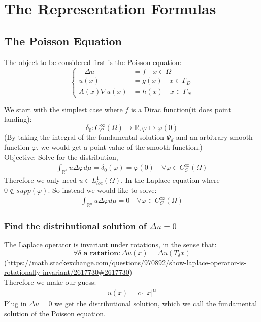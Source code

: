 \documentclass[a4paper,11pt,oneside,fleqn]{book}
\theoremstyle{definition}
\theoremstyle{remark}
\begin{document}
\newpage
\section{The Representation Formulas}
\subsection{The Poisson Equation}
The object to be considered first is the Poisson equation:
\begin{equation}\label{PE}
\left\{
\begin{aligned}
	-\Delta u &= f  \quad x \in \Omega\\
	u(x) &= g(x) \quad x \in \Gamma_D\\
	A(x)\nabla u(x) &= h(x) \quad x \in \Gamma_N
\end{aligned}
\right.	
\end{equation}


We start with the simplest case where $f$ is a Dirac function(it does point landing):
\begin{equation*}
\delta_0: C^\infty_C(\Omega) \rightarrow \mathbb{R}, \varphi \mapsto \varphi(0)	
\end{equation*}
(By taking the integral of the fundamental solution $\Psi_d$ and an arbitrary smooth function $\varphi$, we would get a point value of the smooth function.)\\
Objective: Solve for the distribution,
\begin{align}
	 \int_{\mathbb{R}^d} u \Delta \varphi d\mu = \delta_0(\varphi) = \varphi(0) \quad \forall \varphi \in C_C^\infty(\Omega)
\end{align}
Therefore we only need $u \in L^1_{loc}(\Omega)$. In the Laplace equation where $0 \notin supp(\varphi)$. So instead we would like to solve:
\begin{align*}
	\int_{\mathbb{R}^n} u \Delta \varphi d\mu = 0 \quad \forall \varphi \in C^\infty_C(\Omega)
\end{align*} 

\subsubsection*{Find the distributional solution of $\Delta u = 0$}
The Laplace operator is invariant under rotations, in the sense that:
\begin{equation*}
	\forall \delta \textbf{ a ratation} : \Delta u(x) = \Delta  u(T_\delta x)
\end{equation*}
(\url{https://math.stackexchange.com/questions/970892/show-laplace-operator-is-rotationally-invariant/2617730#2617730})\\
Therefore we make our guess:
\begin{align*}
	u(x) = c \cdot |x|^\alpha
\end{align*}
Plug in $\Delta u = 0$ we get the distributional solution, which we call the fundamental solution of the Poisson equation.
\end{document}

